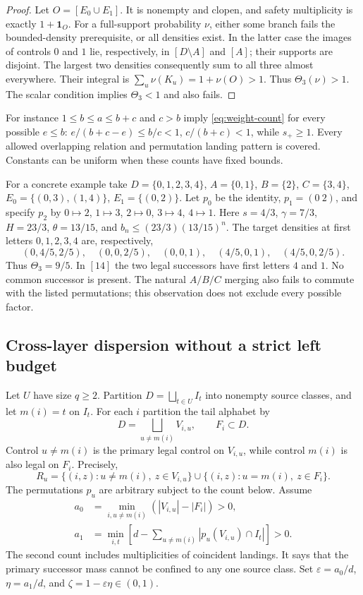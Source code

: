 \documentclass[11pt,reqno]{amsart}
\numberwithin{equation}{section}
\theoremstyle{definition}
\newcommand{\one}{\mathbf 1}
\newcommand{\eps}{\varepsilon}
\begin{document}
\begin{proof}
Let $O=[E_0\cup E_1]$. It is nonempty and clopen, and safety
multiplicity is exactly $1+\one_O$. For a full-support probability
$\nu$, either some branch fails the bounded-density prerequisite,
or all densities exist. In the latter case the images of controls
$0$ and $1$ lie, respectively, in $[D\setminus A]$ and $[A]$;
their supports are disjoint. The largest two densities consequently
sum to all three almost everywhere. Their integral is
$\sum_u\nu(K_u)=1+\nu(O)>1$. Thus $\Theta_3(\nu)>1$.
The scalar condition implies $\Theta_3<1$ and also fails.
\end{proof}

For instance
$1\le b\le a\le b+c$ and $c>b$ imply
\eqref{eq:weight-count} for every possible $e\le b$:
$e/(b+c-e)\le b/c<1$, $c/(b+c)<1$, while $s_+\ge1$.
Every allowed overlapping relation and permutation landing pattern
is covered. Constants can be uniform when these counts have fixed
bounds.

For a concrete example take
$D=\{0,1,2,3,4\}$, $A=\{0,1\}$, $B=\{2\}$,
$C=\{3,4\}$, $E_0=\{(0,3),(1,4)\}$,
$E_1=\{(0,2)\}$. Let $p_0$ be the identity,
$p_1=(0\ 2)$, and specify $p_2$ by
$0\mapsto2$, $1\mapsto3$, $2\mapsto0$, $3\mapsto4$,
$4\mapsto1$. Here $s=4/3$, $\gamma=7/3$, $H=23/3$,
$\theta=13/15$, and
$b_n\le(23/3)(13/15)^n$. The target densities at first letters
$0,1,2,3,4$ are, respectively,
\[
 (0,4/5,2/5),\quad(0,0,2/5),\quad(0,0,1),\quad
 (4/5,0,1),\quad(4/5,0,2/5).
\]
Thus $\Theta_3=9/5$. In $[14]$ the two legal successors have
first letters $4$ and $1$. No common successor is present. The
natural $A/B/C$ merging also fails to commute with the listed
permutations; this observation does not exclude every possible factor.

\subsection{Cross-layer dispersion without a strict left budget}
Let $U$ have size $q\ge2$. Partition $D=\bigsqcup_{t\in U}I_t$
into nonempty source classes, and let $m(i)=t$ on $I_t$.
For each $i$ partition the tail alphabet by
\[
 D=\bigsqcup_{u\ne m(i)}V_{i,u},\qquad F_i\subset D.
\]
Control $u\ne m(i)$ is the primary legal control on $V_{i,u}$,
while control $m(i)$ is also legal on $F_i$. Precisely,
\begin{equation}\label{eq:spread-relation}
 R_u=\{(i,z):u\ne m(i),\ z\in V_{i,u}\}
 \cup\{(i,z):u=m(i),\ z\in F_i\}.
\end{equation}
The permutations $p_u$ are arbitrary subject to the count below.
Assume
\begin{align}
 a_0&=\min_{i,u\ne m(i)}(|V_{i,u}|-|F_i|)>0,
 \label{eq:spread-size}\\
 a_1&=\min_{i,t}\left[d-
       \sum_{u\ne m(i)}|p_u(V_{i,u})\cap I_t|\right]>0.
 \label{eq:spread-land}
\end{align}
The second count includes multiplicities of coincident landings.
It says that the primary successor mass cannot be confined to any
one source class. Set $\eps=a_0/d$, $\eta=a_1/d$, and
$\zeta=1-\eps\eta\in(0,1)$.
\end{document}
